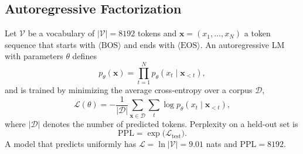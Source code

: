 \documentclass[journal]{IEEEtran}
\newcommand{\BOS}{\langle\mathrm{BOS}\rangle}
\newcommand{\EOS}{\langle\mathrm{EOS}\rangle}
\begin{document}
\subsection{Autoregressive Factorization}
Let $\mathcal{V}$ be a vocabulary of $|\mathcal{V}|=8192$ tokens and $\mathbf{x}=(x_1,\dots,x_N)$ a token sequence that starts with $\BOS$ and ends with $\EOS$. An autoregressive LM with parameters $\theta$ defines
\begin{equation}
p_\theta(\mathbf{x}) = \prod_{t=1}^{N} p_\theta(x_t \mid \mathbf{x}_{<t}),
\label{eq:factor}
\end{equation}
and is trained by minimizing the average cross-entropy over a corpus $\mathcal{D}$,
\begin{equation}
\mathcal{L}(\theta) = -\frac{1}{|\mathcal{D}|}\sum_{\mathbf{x}\in\mathcal{D}} \sum_{t} \log p_\theta(x_t \mid \mathbf{x}_{<t}),
\label{eq:ce}
\end{equation}
where $|\mathcal{D}|$ denotes the number of predicted tokens. Perplexity on a held-out set is
\begin{equation}
\mathrm{PPL} = \exp\big(\mathcal{L}_{\text{test}}\big).
\label{eq:ppl}
\end{equation}
A model that predicts uniformly has $\mathcal{L}=\ln|\mathcal{V}|=9.01$ nats and $\mathrm{PPL}=8192$.
\end{document}

